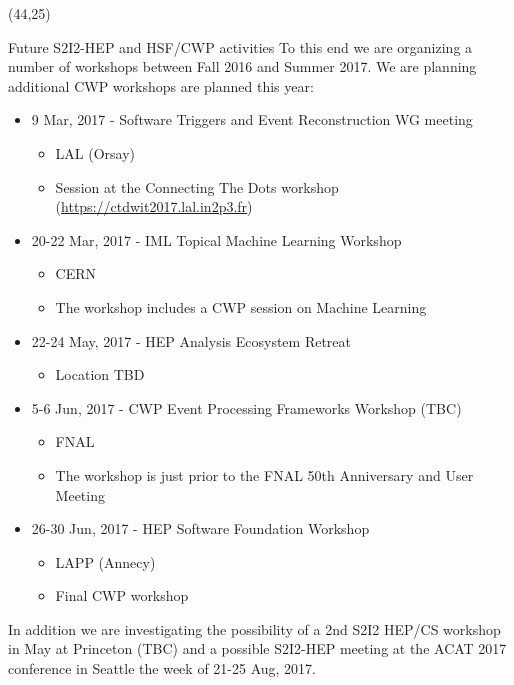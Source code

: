 \documentclass[final]{beamer}
\begin{document}
\begin{frame}{}
\begin{textblock}{38.0}(44,25)
\begin{block}{Future S2I2-HEP and HSF/CWP activities}
To this end we are organizing a number of workshops between Fall 2016 and Summer 2017.
We are planning additional CWP workshops are planned this year: \\
\begin{itemize}
\item 9 Mar, 2017 - Software Triggers and Event Reconstruction WG meeting
    \begin{itemize}
    \item LAL (Orsay)
    \item Session at the Connecting The Dots workshop (\url{https://ctdwit2017.lal.in2p3.fr})
    \end{itemize}
\item 20-22 Mar, 2017 - IML Topical Machine Learning Workshop
    \begin{itemize}
    \item CERN
    \item The workshop includes a CWP session on Machine Learning
    \end{itemize}
\item 22-24 May, 2017 - HEP Analysis Ecosystem Retreat
    \begin{itemize}
    \item Location TBD
    \end{itemize}
\item 5-6 Jun, 2017 - CWP Event Processing Frameworks Workshop (TBC)
    \begin{itemize}
    \item FNAL
    \item The workshop is just prior to the FNAL 50th Anniversary and User Meeting
    \end{itemize}
\item 26-30 Jun, 2017 - HEP Software Foundation Workshop
    \begin{itemize}
    \item LAPP (Annecy)
    \item Final CWP workshop
    \end{itemize}
\end{itemize}
In addition we are investigating the possibility of a 2nd S2I2 HEP/CS workshop in May at Princeton (TBC) and a possible S2I2-HEP meeting at the ACAT 2017 conference in Seattle the week of 21-25 Aug, 2017.
\end{block}
\end{textblock}











\end{frame}
\end{document}
